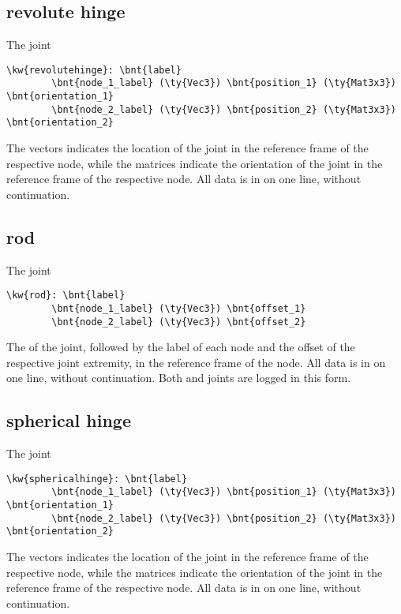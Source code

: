 \subsection{revolute hinge}
The  joint
\begin{Verbatim}[commandchars=\\\{\}]
    \kw{revolutehinge}: \bnt{label}
        \bnt{node_1_label} (\ty{Vec3}) \bnt{position_1} (\ty{Mat3x3}) \bnt{orientation_1}
        \bnt{node_2_label} (\ty{Vec3}) \bnt{position_2} (\ty{Mat3x3}) \bnt{orientation_2}
\end{Verbatim}
The  vectors indicates the location of the joint
in the reference frame of the respective node,
while the  matrices indicate the orientation of the joint
in the reference frame of the respective node.
All data is in on one line, without continuation.

\subsection{rod}
The  joint
\begin{Verbatim}[commandchars=\\\{\}]
    \kw{rod}: \bnt{label}
        \bnt{node_1_label} (\ty{Vec3}) \bnt{offset_1}
        \bnt{node_2_label} (\ty{Vec3}) \bnt{offset_2}
\end{Verbatim}
The  of the joint, followed by the label of each node
and the offset of the respective joint extremity,
in the reference frame of the node.
All data is in on one line, without continuation.
Both  and  joints are logged
in this form.

\subsection{spherical hinge}
The  joint
\begin{Verbatim}[commandchars=\\\{\}]
    \kw{sphericalhinge}: \bnt{label}
        \bnt{node_1_label} (\ty{Vec3}) \bnt{position_1} (\ty{Mat3x3}) \bnt{orientation_1}
        \bnt{node_2_label} (\ty{Vec3}) \bnt{position_2} (\ty{Mat3x3}) \bnt{orientation_2}
\end{Verbatim}
The  vectors indicates the location of the joint
in the reference frame of the respective node,
while the  matrices indicate the orientation of the joint
in the reference frame of the respective node.
All data is in on one line, without continuation.

